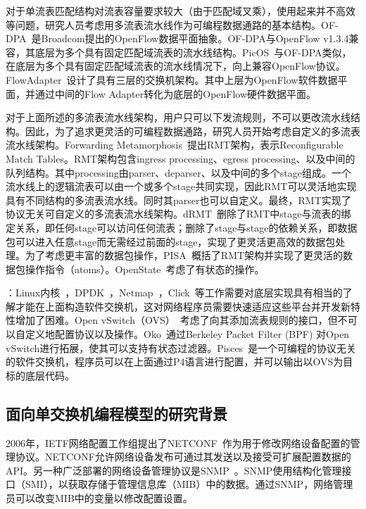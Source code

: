 对于单流表匹配结构对流表容量要求较大（由于匹配域叉乘），使用起来并不高效等问题，研究人员考虑用多流表流水线作为可编程数据通路的基本结构。OF-DPA~\cite{OF-DPA}是Broadcom提出的OpenFlow数据平面抽象。OF-DPA与OpenFlow v1.3.4兼容，其底层为多个具有固定匹配域流表的流水线结构。PicOS~\cite{PicOS}与OF-DPA类似，在底层为多个具有固定匹配域流表的流水线情况下，向上兼容OpenFlow协议。FlowAdapter~\cite{pan2013flowadapter}设计了具有三层的交换机架构。其中上层为OpenFlow软件数据平面，并通过中间的Flow Adapter转化为底层的OpenFlow硬件数据平面。

对于上面所述的多流表流水线架构，用户只可以下发流规则，不可以更改流水线结构。因此，为了追求更灵活的可编程数据通路，研究人员开始考虑自定义的多流表流水线架构。Forwarding Metamorphosis~\cite{rmt}提出RMT架构，表示Reconfigurable Match Tables。RMT架构包含ingress processing、egress processing、以及中间的队列结构。其中processing由parser、deparser、以及中间的多个stage组成。一个流水线上的逻辑流表可以由一个或多个stage共同实现，因此RMT可以灵活地实现具有不同结构的多流表流水线。同时其parser也可以自定义。最终，RMT实现了协议无关可自定义的多流表流水线架构。dRMT~\cite{chole2017drmt}删除了RMT中stage与流表的绑定关系，即任何stage可以访问任何流表；删除了stage与stage的依赖关系，即数据包可以进入任意stage而无需经过前面的stage，实现了更灵活更高效的数据包处理。为了考虑更丰富的数据包操作，PISA~\cite{pisa}概括了RMT架构并实现了更灵活的数据包操作指令（atoms）。OpenState~\cite{bianchi2014openstate}考虑了有状态的操作。

：Linux内核~\cite{linux}，DPDK~\cite{dpdk}，Netmap~\cite{rizzo2012netmap}，Click~\cite{kohler2000click}等工作需要对底层实现具有相当的了解才能在上面构造软件交换机，这对网络程序员需要快速适应这些平台并开发新特性增加了困难。Open vSwitch（OVS）~\cite{pfaff2015design}考虑了向其添加流表规则的接口，但不可以自定义地配置协议以及操作。Oko~\cite{chaignon2018oko}通过Berkeley Packet Filter (BPF) 对Open vSwitch进行拓展，使其可以支持有状态过滤器。Pisces~\cite{shahbaz2016pisces}是一个可编程的协议无关的软件交换机，程序员可以在上面通过P4语言进行配置，并可以输出以OVS为目标的底层代码。


\subsection{面向单交换机编程模型的研究背景}

2006年，IETF网络配置工作组提出了NETCONF~\cite{enns2006netconf}作为用于修改网络设备配置的管理协议。NETCONF允许网络设备发布可通过其发送以及接受可扩展配置数据的API。另一种广泛部署的网络设备管理协议是SNMP~\cite{hare2011simple}。SNMP使用结构化管理接口（SMI），以获取存储于管理信息库（MIB）中的数据。通过SNMP，网络管理员可以改变MIB中的变量以修改配置设置。

